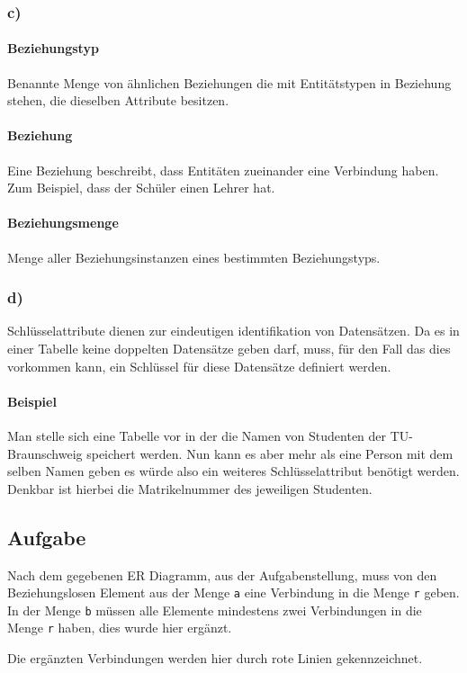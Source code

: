 \documentclass[11pt,a4paper,DIV=9]{scrartcl}
\newcounter{temp}
\newcommand{\aufgabe}[1]{
  \setcounter{temp}{\value{subsection}}
  \setcounter{subsection}{#1}
  \addtocounter{subsection}{-1}
  \subsection{Aufgabe}
  \setcounter{subsection}{\value{temp}}
}
\newcommand{\teil}[2][]{
  \subsubsection*{#2) #1}
}
\begin{document}
\teil{c}
  \paragraph{Beziehungstyp} %
  \label{par:beziehungstyp}
   Benannte Menge von ähnlichen Beziehungen die mit Entitätstypen in Beziehung stehen, die dieselben Attribute besitzen.
  \paragraph{Beziehung} %
  \label{par:beziehung}
   Eine Beziehung beschreibt, dass Entitäten zueinander eine Verbindung haben. Zum Beispiel, dass der Schüler einen Lehrer hat. 
  \paragraph{Beziehungsmenge} %
  \label{par:beziehungsmenge}
    Menge aller Beziehungsinstanzen eines bestimmten Beziehungstyps.

\teil{d}
  Schlüsselattribute dienen zur eindeutigen identifikation von Datensätzen. Da es in einer Tabelle keine doppelten Datensätze geben darf, muss, für den Fall das dies vorkommen kann, ein Schlüssel für diese Datensätze definiert werden.
  \paragraph{Beispiel} Man stelle sich eine Tabelle vor in der die Namen von Studenten der TU-Braunschweig speichert werden. Nun kann es aber mehr als eine Person mit dem selben Namen geben es würde also ein weiteres Schlüsselattribut benötigt werden. Denkbar ist hierbei die Matrikelnummer des jeweiligen Studenten.


\aufgabe{3}
  Nach dem gegebenen ER Diagramm, aus der Aufgabenstellung, muss von den Beziehungslosen Element aus der Menge \texttt{a} eine Verbindung in die Menge \texttt{r} geben. In der Menge \texttt{b} müssen alle Elemente mindestens zwei Verbindungen in die Menge \texttt{r} haben, dies wurde hier ergänzt.

  Die ergänzten Verbindungen werden hier durch rote Linien gekennzeichnet.
  \\
\end{document}
